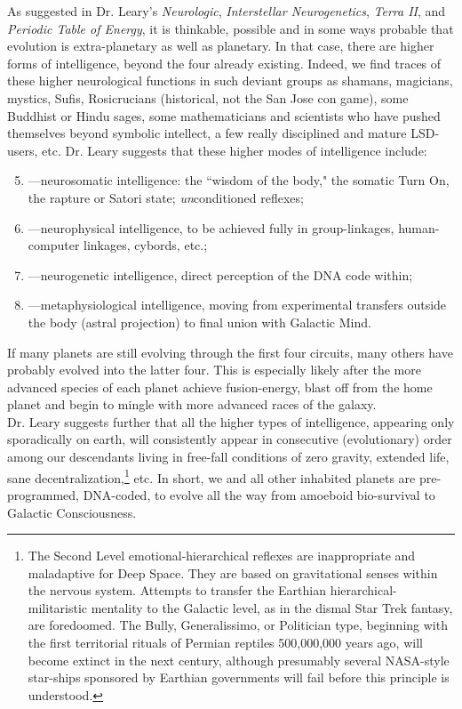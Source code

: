 As suggested in Dr. Leary's \emph{Neurologic}, \emph{Interstellar Neurogenetics}, \emph{Terra II}, and \emph{Periodic Table of Energy}, it is thinkable, possible and in some ways probable that evolution is extra-planetary as well as planetary. In that case, there are higher forms of intelligence, beyond the four already existing. Indeed, we find traces of these higher neurological functions in such deviant groups as shamans, magicians, mystics, Sufis, Rosicrucians (historical, not the San Jose con game), some Buddhist or Hindu sages, some mathematicians and scientists who have pushed themselves beyond symbolic intellect, a few really disciplined and mature LSD-users, etc. Dr. Leary suggests that these higher modes of intelligence include:
\begin{enumerate}
\setcounter{enumi}{4}
\item ---neurosomatic intelligence: the ``wisdom of the body," the somatic Turn On, the rapture or Satori state; \emph{un}conditioned reflexes;
\item ---neurophysical intelligence, to be achieved fully in group-linkages, human-computer linkages, cybords, etc.;
\item ---neurogenetic intelligence, direct perception of the DNA code within;
\item ---metaphysiological intelligence, moving from experimental transfers outside the body (astral projection) to final union with Galactic Mind.
\end{enumerate}
If many planets are still evolving through the first four circuits, many others have probably evolved into the latter four. This is especially likely after the more advanced species of each planet achieve fusion-energy, blast off from the home planet and begin to mingle with more advanced races of the galaxy.\\
Dr. Leary suggests further that all the higher types of intelligence, appearing only sporadically on earth, will consistently appear in consecutive (evolutionary) order among our descendants living in free-fall conditions of zero gravity, extended life, sane decentralization,\footnote{The Second Level emotional-hierarchical reflexes are inappropriate and maladaptive for Deep Space. They are based on gravitational senses within the nervous system. Attempts to transfer the Earthian hierarchical-militaristic mentality to the Galactic level, as in the dismal Star Trek fantasy, are foredoomed. The Bully, Generalissimo, or Politician type, beginning with the first territorial rituals of Permian reptiles 500,000,000 years ago, will become extinct in the next century, although presumably several NASA-style star-ships sponsored by Earthian governments will fail before this principle is understood.} etc. In short, we and all other inhabited planets are pre-programmed, DNA-coded, to evolve all the way from amoeboid bio-survival to Galactic Consciousness.\\
